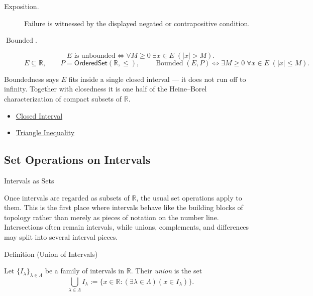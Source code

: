 \begin{remark*}
\begin{description}
  \item[Exposition.]
  Failure is witnessed by the displayed negated or contrapositive condition.

  \item[\(\operatorname{Bounded}.\)]
  \[
E \text{ is unbounded} \Longleftrightarrow \forall M\ge 0\;\exists x\in E\;(|x|>M).
\]
\[
E\subseteq\mathbb{R},\qquad P=\mathsf{OrderedSet}(\mathbb{R},\leq),\qquad
\operatorname{Bounded}(E,P)
\Longleftrightarrow
\exists M\ge 0\;\forall x\in E\;(|x|\le M).
\]
\end{description}
\end{remark*}
\begin{remark*}[Interpretation]
Boundedness says $E$ fits inside a single closed interval --- it does not run off to infinity. Together with closedness it is one half of the Heine--Borel characterization of compact subsets of $\mathbb{R}$.
\end{remark*}
\begin{dependencies}
\begin{itemize}
  \item \hyperref[def:closed-interval]{Closed Interval}
  \item \hyperref[thm:triangle-inequality]{Triangle Inequality}
\end{itemize}
\end{dependencies}

\subsection*{Set Operations on Intervals}
\label{subsec:set-operations-on-intervals}

\begin{topicbox}{Intervals as Sets}
\begin{exposition}
Once intervals are regarded as subsets of $\mathbb{R}$, the usual set
operations apply to them. This is the first place where intervals behave like
the building blocks of topology rather than merely as pieces of notation on
the number line. Intersections often remain intervals, while unions,
complements, and differences may split into several interval pieces.
\end{exposition}
\end{topicbox}

\begin{definitionbox}{Definition (Union of Intervals)}
\begin{definition}
\label{def:union-of-intervals}
Let $\{I_\lambda\}_{\lambda\in\Lambda}$ be a family of intervals in
$\mathbb{R}$.  Their \emph{union} is the set
\[
  \bigcup_{\lambda\in\Lambda}I_\lambda
  :=
  \{x\in\mathbb{R}:(\exists\lambda\in\Lambda)(x\in I_\lambda)\}.
\]
\end{definition}
\end{definitionbox}

